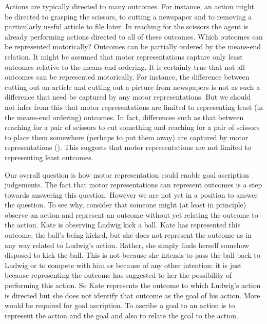 \documentclass[12pt,\papersize]{extarticle}
\begin{document}
Actions are typically directed to many outcomes.  For instance, an action might be directed to grasping the scissors, to cutting a newspaper and to removing a particularly useful article to file later.  In reaching for the scissors the agent is already performing actions directed to all of these outcomes.  Which outcomes can be represented motorically?  Outcomes can be partially ordered by the means-end relation. It might be assumed that motor representations capture only least outcomes relative to the means-end ordering. It is certainly true that not all outcomes can be represented motorically.  For instance, the difference between cutting out an article and cutting out a picture from newspapers is not as such a difference that need be captured by any motor representations.  But we should not infer from this that motor representations are limited to representing least (in the means-end ordering) outcomes. In fact, differences such as that between reaching for a pair of scissors to cut something and reaching for a pair of scissors to place them somewhere (perhaps to put them away) are captured by motor representations (\citealp{Fogassi:2005nf, cattaneo:2007_impairment, bonini:2010_ventral, }). This suggests that motor representations are not limited to representing least outcomes.

Our overall question is how motor representation could enable goal ascription judgements. The fact that motor representations can represent outcomes is a step towards answering this question. However we are not yet in a position to answer the question. To see why, consider that someone might (at least in principle) observe an action and represent an outcome without yet relating the outcome to the action. Kate is observing Ludwig kick a ball. Kate has represented this outcome, the ball's being kicked, but she does not represent the outcome as in any way related to Ludwig's action. Rather, she simply finds herself somehow disposed to kick the ball. This is not because she intends to pass the ball back to Ludwig or to compete with him or because of any other intention: it is just because representing the outcome has suggested to her the possibility of performing this action. So Kate represents the outcome to which Ludwig's action is directed but she does not identify that outcome as the goal of his action. More would be required for goal ascription. To ascribe a goal to an action is to represent the action and the goal and also to relate the goal to the action.
\end{document}
